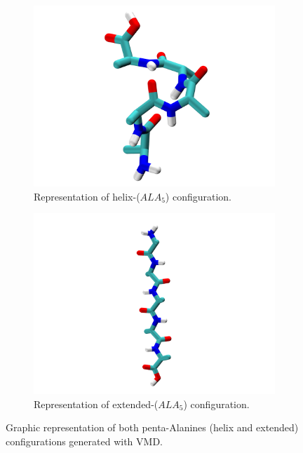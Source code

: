 \begin{figure}[h]
    \centering
    \begin{subfigure}[t]{0.45\textwidth}
    \includegraphics[width=\textwidth]{Figures/Chapter_5/5ALA_helix.png}
    \caption{Representation of helix-($ALA_5$) configuration.}
    \label{fig:5ALAhelix}
    \end{subfigure}
    \hspace{0.5cm}
    \begin{subfigure}[t]{0.45\textwidth}
    \includegraphics[width=\textwidth]{Figures/Chapter_5/5ALA_extended.png}
    \caption{Representation of extended-($ALA_5$) configuration.}
    \label{fig:5ALAext}
    \end{subfigure}
    
    \caption{Graphic representation of both penta-Alanines (helix and extended) configurations generated with VMD.}
    \label{fig:5_ALA_struct}
\end{figure}

